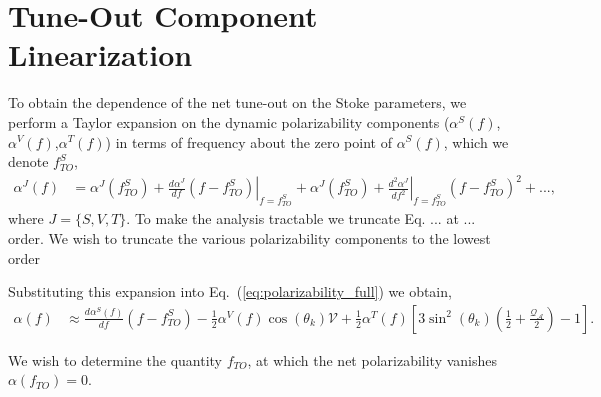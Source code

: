 \documentclass{article}
\newcommand{\difn}[3]{\frac{d^#3 #1}{d #2^#3}}
\newcommand{\derivn}[3][{}]{
    \frac{d^{#1} #2}{d #3^{#1}}
}
\begin{document}
\section{Tune-Out Component Linearization}
To obtain the dependence of the net tune-out on the Stoke parameters, we perform a Taylor expansion on the dynamic polarizability components (\(\alpha^S(f)\),\(\alpha^V(f)\),\(\alpha^T(f)\)) in terms of frequency about the zero point of \(\alpha^S(f)\), which we denote \(f^{S}_{TO}\),
\begin{align}
    \alpha^J(f) &= \alpha^J(f^{S}_{TO}) + \left. \derivn{\alpha^J}{f}{{}}(f-f^{S}_{TO})\right|_{f=f^{S}_{TO}} + \alpha^J(f^{S}_{TO}) +\left. \difn{\alpha^J}{f}{2}\right|_{f=f^{S}_{TO}}(f-f^{S}_{TO})^2 + ...,
\end{align}
where \(J=\{S,V,T\}\). To make the analysis tractable we truncate Eq. ... at ... order. We wish to truncate the various polarizability components to the lowest order


 Substituting this expansion into Eq.~(\ref{eq:polarizability_full}) we obtain,
\begin{align}
    \alpha(f) &\approx \derivn{\alpha^S(f)}{f}{{}}(f-f^{S}_{TO}) 
    -\frac{1}{2} \alpha^V(f) \cos \left( \theta_k \right) \mathcal{V}  + 
    \frac{1}{2} \alpha^T(f) \left[3 \sin^2\left( \theta_k \right) \left(\frac{1}{2} +  \frac{\mathcal{Q_{A}}}{2}\right) -1 \right]  . \label{eq:main_to}
\end{align}

We wish to determine the quantity \(f_{TO}\), at which the net polarizability vanishes \(\alpha(f_{TO})=0\).
\end{document}
